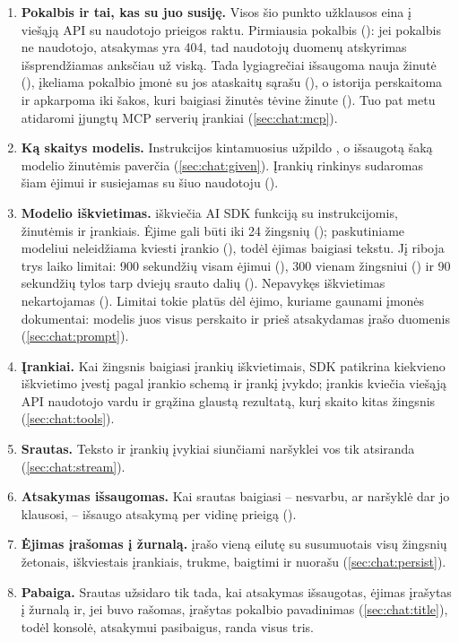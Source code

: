 \begin{enumerate}
    .
  \item \textbf{Pokalbis ir tai, kas su juo susiję.} Visos šio punkto užklausos eina į viešąją
    API su naudotojo prieigos raktu. Pirmiausia pokalbis (): jei pokalbis ne
    naudotojo, atsakymas yra 404, tad naudotojų duomenų atskyrimas išsprendžiamas anksčiau už
    viską. Tada lygiagrečiai išsaugoma nauja žinutė (), įkeliama pokalbio
    įmonė su jos ataskaitų sąrašu (), o istorija perskaitoma ir apkarpoma iki
    šakos, kuri baigiasi žinutės tėvine žinute (). Tuo pat metu atidaromi
    įjungtų MCP serverių įrankiai (\cref{sec:chat:mcp}).
  \item \textbf{Ką skaitys modelis.} Instrukcijos kintamuosius užpildo ,
    o išsaugotą šaką modelio žinutėmis paverčia  (\cref{sec:chat:given}).
    Įrankių rinkinys sudaromas šiam ėjimui ir susiejamas su šiuo naudotoju ().
  \item \textbf{Modelio iškvietimas.}  iškviečia AI SDK funkciją
     su instrukcijomis, žinutėmis ir įrankiais. Ėjime gali būti iki 24
    žingsnių (); paskutiniame modeliui neleidžiama kviesti įrankio
    (), todėl ėjimas baigiasi tekstu. Jį riboja trys laiko limitai:
    900 sekundžių visam ėjimui (), 300 vienam žingsniui
    () ir 90 sekundžių tylos tarp dviejų srauto dalių
    (). Nepavykęs iškvietimas nekartojamas ().
    Limitai tokie platūs dėl ėjimo, kuriame gaunami įmonės dokumentai: modelis juos visus
    perskaito ir prieš atsakydamas įrašo duomenis (\cref{sec:chat:prompt}).
  \item \textbf{Įrankiai.} Kai žingsnis baigiasi įrankių iškvietimais, SDK patikrina kiekvieno
    iškvietimo įvestį pagal įrankio schemą ir įrankį įvykdo; įrankis kviečia viešąją API
    naudotojo vardu ir grąžina glaustą rezultatą, kurį skaito kitas žingsnis
    (\cref{sec:chat:tools}).
  \item \textbf{Srautas.} Teksto ir įrankių įvykiai siunčiami naršyklei vos tik atsiranda
    (\cref{sec:chat:stream}).
  \item \textbf{Atsakymas išsaugomas.} Kai srautas baigiasi -- nesvarbu, ar naršyklė dar jo
    klausosi, --  išsaugo atsakymą per vidinę prieigą
    ().
  \item \textbf{Ėjimas įrašomas į žurnalą.}  įrašo vieną  eilutę su
    susumuotais visų žingsnių žetonais, iškviestais įrankiais, trukme, baigtimi ir nuorašu
    (\cref{sec:chat:persist}).
  \item \textbf{Pabaiga.} Srautas užsidaro tik tada, kai atsakymas išsaugotas, ėjimas įrašytas į
    žurnalą ir, jei buvo rašomas, įrašytas pokalbio pavadinimas (\cref{sec:chat:title}), todėl
    konsolė, atsakymui pasibaigus, randa visus tris.
\end{enumerate}

